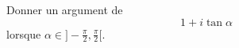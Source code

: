 Donner un argument de 
\[1+i\tan \alpha\]
lorsque $\alpha \in ]-\frac{\pi}{2}, \frac{\pi}{2}[$.\bigskip